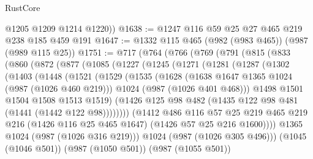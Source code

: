 \begin{lexlean}{RustCore}
\begin{coremodule}
        @1205
        @1209
        @1214
        @1220))
@1638 := @1247 @116 @59 @25 @27 @465 @219 @238 @185 @459 @191
@1647 := @1332 @115 @465 (@982 (@983 @465)) (@987 (@989 @115 @25))
@1751 := @717
    (@764
      (@766
        (@769
          (@791
            (@815
              (@833
                (@860
                  (@872
                    (@877
                      (@1085
                        (@1227
                          (@1245
                            (@1271
                              (@1281
                                (@1287
                                  (@1302
                                    (@1403
                                      (@1448
                                        (@1521
                                          (@1529
                                            (@1535
                                              (@1628
                                                (@1638 @1647 @1365 @1024 (@987 (@1026 @460 @219)))
                                                @1024
                                                (@987 (@1026 @401 @468)))
                                              @1498
                                              @1501
                                              @1504
                                              @1508
                                              @1513
                                              @1519)
                                            (@1426
                                              @125
                                              @98
                                              @482
                                              (@1435 @122 @98 @481 (@1441 (@1442 @122 @98))))))))
                                    (@1412
                                      @486
                                      @116
                                      @57
                                      @25
                                      @219
                                      @465
                                      @219
                                      @216
                                      (@1426 @116 @25 @465 @1647)
                                      (@1426 @57 @25 @216 @1600))))
                                @1365
                                @1024
                                (@987 (@1026 @316 @219)))
                              @1024
                              (@987 (@1026 @305 @496)))
                            (@1045 (@1046 @501))
                            (@987 (@1050 @501))
                            (@987 (@1055 @501))

\end{coremodule}
\end{lexlean}
